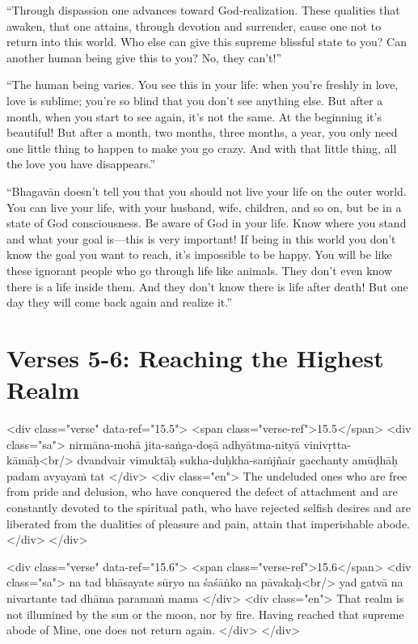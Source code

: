 \enquote{Through dispassion one advances toward God-realization. These qualities that awaken, that one attains, through devotion and surrender, cause one not to return into this world. Who else can give this supreme blissful state to you? Can another human being give this to you? No, they can’t!}

\enquote{The human being varies. You see this in your life: when you’re freshly in love, love is sublime; you’re so blind that you don’t see anything else. But after a month, when you start to see again, it’s not the same. At the beginning it’s beautiful! But after a month, two months, three months, a year, you only need one little thing to happen to make you go crazy. And with that little thing, all the love you have disappears.}

\enquote{Bhagavān doesn’t tell you that you should not live your life on the outer world. You can live your life, with your husband, wife, children, and so on, but be in a state of God consciousness. Be aware of God in your life. Know where you stand and what your goal is---this is very important! If being in this world you don’t know the goal you want to reach, it’s impossible to be happy. You will be like these ignorant people who go through life like animals. They don’t even know there is a life inside them. And they don’t know there is life after death! But one day they will come back again and realize it.}


\section{Verses 5-6: Reaching the Highest Realm}\label{sec-verses-5-6-reaching-the-highest-realm}


\begin{html}
<div class="verse" data-ref="15.5">
  <span class="verse-ref">15.5</span>
  <div class="sa">
    nirmāna-mohā jita-saṅga-doṣā adhyātma-nityā vinivṛtta-kāmāḥ<br/>
    dvandvair vimuktāḥ sukha-duḥkha-saṁjñair gacchanty amūḍhāḥ padam avyayaṁ tat
  </div>
  <div class="en">
    The undeluded ones who are free from pride and delusion, who have conquered the defect of attachment and are constantly devoted to the spiritual path, who have rejected selfish desires and are liberated from the dualities of pleasure and pain, attain that imperishable abode.
  </div>
</div>
\end{html}



\begin{html}
<div class="verse" data-ref="15.6">
  <span class="verse-ref">15.6</span>
  <div class="sa">
    na tad bhāsayate sūryo na śaśāṅko na pāvakaḥ<br/>
    yad gatvā na nivartante tad dhāma paramaṁ mama
  </div>
  <div class="en">
    That realm is not illumined by the sun or the moon, nor by fire. Having reached that supreme abode of Mine, one does not return again.
  </div>
</div>
\end{html}


